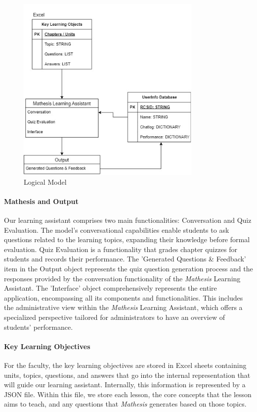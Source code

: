 \documentclass[12pt,a4paper]{article}
\begin{document}
    \begin{figure}[H]
        \centering
        \includegraphics[width=0.8\textwidth]{images/logicalDiagram}
        \caption{Logical Model}
        \label{fig:logicalModel}
    \end{figure}

    \paragraph{Mathesis and Output}
    Our learning assistant comprises two main functionalities: Conversation and Quiz Evaluation.
    The model's conversational capabilities enable students to ask questions related to the learning
    topics, expanding their knowledge before formal evaluation. Quiz Evaluation is a functionality
    that grades chapter quizzes for students and records their performance. The 'Generated Questions
    \& Feedback' item in the Output object represents the quiz question generation process and the
    responses provided by the conversation functionality of the \textit{Mathesis} Learning Assistant. The
    'Interface' object comprehensively represents the entire application, encompassing all its
    components and functionalities.  This includes the administrative view within the \textit{Mathesis}
    Learning Assistant, which offers a specialized perspective tailored for administrators to have
    an overview of students' performance.

    \paragraph{Key Learning Objectives}
    For the faculty, the key learning
    objectives are stored in Excel sheets containing units, topics, questions, and answers that
    go into the internal representation that will guide our learning assistant.  Internally, this
    information is represented by a JSON file.  Within this file, we store each lesson, the core
    concepts that the lesson aims to teach, and any questions that \textit{Mathesis} generates based
    on those topics.
\end{document}
